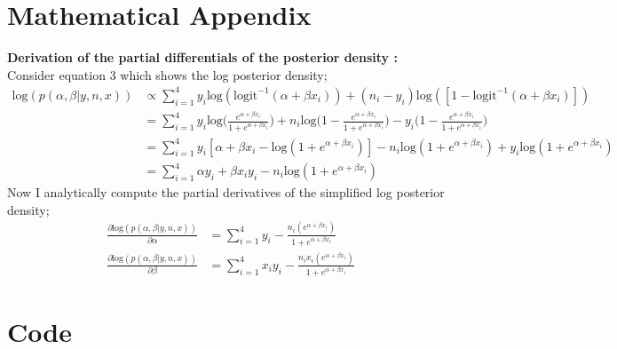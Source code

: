 \documentclass{article}
\begin{document}
\section{Mathematical Appendix}
\textbf{Derivation of the partial differentials of the posterior density :}\\
Consider equation 3 which shows the log posterior density;
\begin{align*}
\text{log} (p(\alpha, \beta | y, n, x)) &\propto \sum_{i = 1}^{4}y_i \text{log}(\text{logit}^{-1}(\alpha + \beta x_i)) + (n_i - y_i) \text{log}([1 - \text{logit}^{-1}(\alpha + \beta x_i) ])\\
&= \sum_{i = 1}^{4} y_i \text{log}\Big(\frac{e^{\alpha + \beta x_i}}{1 + e^{\alpha + \beta x_i}}\Big)
 + n_i \text{log} \Big( 1 - \frac{e^{\alpha + \beta x_i}}{1 + e^{\alpha + \beta x_i}}\Big) - y_i \Big( 1 - \frac{e^{\alpha + \beta x_i}}{1 + e^{\alpha + \beta x_i}}\Big)\\
 &= \sum_{i = 1}^{4} y_i [\alpha + \beta x_i - \text{log}(1 + e^{\alpha + \beta x_i})] - n_i \text{log}(1 + e^{\alpha + \beta x_i}) + y_i \text{log}(1 + e^{\alpha + \beta x_i})\\
 &= \sum_{i = 1}^{4} \alpha y_i + \beta x_i y_i - n_i \text{log}(1 + e^{\alpha + \beta x_i})
\end{align*}
Now I analytically compute the partial derivatives of the simplified log posterior density;
\begin{align*}
\frac{\partial \text{log} (p(\alpha, \beta | y, n, x))}{\partial \alpha} &= \sum_{i = 1}^{4} y_i - \frac{n_i (e^{\alpha + \beta x_i})}{1 + e ^{\alpha + \beta x_i}}\\
%
\frac{\partial \text{log}(p(\alpha, \beta | y, n, x))}{\partial \beta} &= \sum_{i = 1}^{4} x_iy_i - \frac{n_i x_i ( e^{\alpha + \beta x_i})}{1 + e ^{\alpha + \beta x_i}}
\end{align*}


\section{Code}
\end{document}

